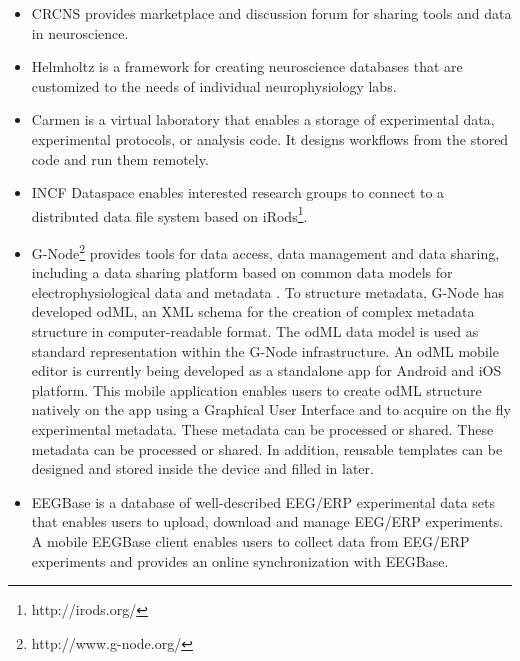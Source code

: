 \documentclass[conference]{IEEEtran}
\begin{document}
\begin{itemize}

\item	CRCNS \cite{CRCNS} provides marketplace and discussion forum for sharing tools and data in neuroscience.
\item	Helmholtz \cite{10.3389/conf.fninf.2013.09.00025} is a framework for creating neuroscience databases that are customized to the needs of individual neurophysiology labs.
\item	Carmen \cite{fgibson:Watson2007} is a virtual laboratory that enables a storage of experimental data, experimental protocols, or analysis code. It designs workflows from the stored code and run them remotely.
\item	INCF Dataspace \cite{dataspace} enables interested research groups to connect to a distributed data file system based on iRods\footnote{http://irods.org/}.
\item	G-Node\footnote{http://www.g-node.org/} provides tools for data access, data management and data sharing, including a data sharing platform \cite{Sobolev:2014} based on common data models for electrophysiological data and metadata \cite{Garcia:2014,10.3389/fninf.2011.00016}. To structure metadata, G-Node has developed odML, an XML schema for the creation of complex metadata structure in computer-readable format\cite{10.3389/fninf.2011.00016}. The odML data model is used as standard representation within the G-Node infrastructure. An odML mobile editor \cite{10.3389/conf.fninf.2014.18.00053} is currently being developed as a standalone app for Android and iOS platform. This mobile application enables users to create odML structure natively on the app using a Graphical User Interface and to acquire on the fly experimental metadata. These metadata can be processed or shared. These metadata can be processed or shared. In addition, reusable templates can be designed and stored inside the device and filled in later.
\item	EEGBase \cite{ISI:000306821100004} is a database of well-described EEG/ERP experimental data sets that enables users to upload, download and manage EEG/ERP experiments. A mobile EEGBase client \cite{10.3389/conf.fninf.2013.09.00046} enables users to collect data from EEG/ERP experiments and provides an online synchronization with EEGBase.



\end{itemize}
\end{document}
